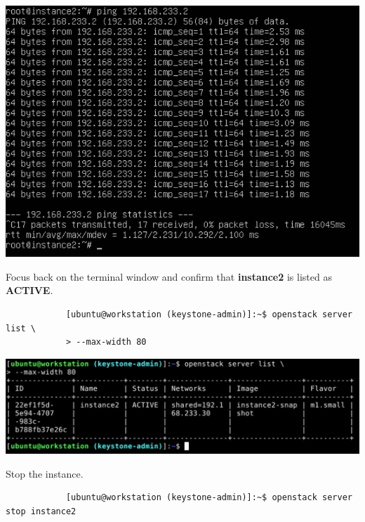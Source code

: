 \documentclass[letterpaper, 12pt]{article}
\begin{document}
\begin{enumerate}
\begin{labstep}
        \begin{center}
            \includegraphics[width=\linewidth]{images/part4/step15.png}
        \end{center}
    \end{labstep}

    \begin{labstep}
        Focus back on the terminal window and confirm that \textbf{instance2} is listed as \textbf{ACTIVE}.
        \begin{lstlisting}
            [ubuntu@workstation (keystone-admin)]:~$ openstack server list \
            > --max-width 80
        \end{lstlisting}

        \begin{center}
            \includegraphics[width=\linewidth]{images/part4/step16.png}
        \end{center}
    \end{labstep}

    \begin{labstep}
        Stop the instance.
        \begin{lstlisting}
            [ubuntu@workstation (keystone-admin)]:~$ openstack server stop instance2
        \end{lstlisting}


\end{labstep}
\end{enumerate}
\end{document}
